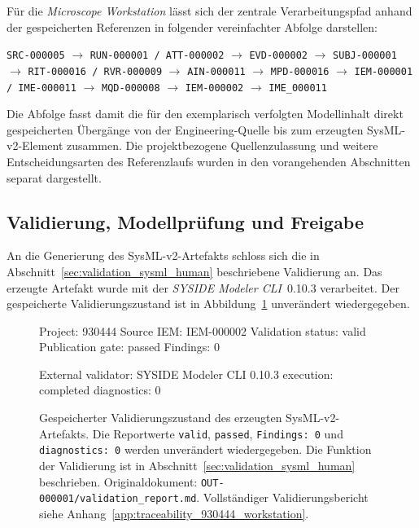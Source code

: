 Für die \emph{Microscope Workstation} lässt sich der zentrale
Verarbeitungspfad anhand der gespeicherten Referenzen in folgender
vereinfachter Abfolge darstellen:

\begin{center}
\small
\texttt{SRC-000005}
$\rightarrow$
\texttt{RUN-000001 / ATT-000002}
$\rightarrow$
\texttt{EVD-000002}
$\rightarrow$
\texttt{SUBJ-000001}
$\rightarrow$
\texttt{RIT-000016 / RVR-000009}
$\rightarrow$
\texttt{AIN-000011}
$\rightarrow$
\texttt{MPD-000016}
$\rightarrow$
\texttt{IEM-000001 / IME-000011}
$\rightarrow$
\texttt{MQD-000008}
$\rightarrow$
\texttt{IEM-000002}
$\rightarrow$
\texttt{IME\_000011}
\end{center}

Die Abfolge fasst damit die für den exemplarisch verfolgten Modellinhalt
direkt gespeicherten Übergänge von der Engineering-Quelle bis zum erzeugten
SysML-v2-Element zusammen. Die projektbezogene Quellenzulassung und weitere
Entscheidungsarten des Referenzlaufs wurden in den vorangehenden Abschnitten
separat dargestellt.

\subsection{Validierung, Modellprüfung und Freigabe}
\label{sec:results_traceability_release}

An die Generierung des SysML-v2-Artefakts schloss sich die in
Abschnitt~\ref{sec:validation_sysml_human} beschriebene Validierung an.
Das erzeugte Artefakt wurde mit der
\emph{SYSIDE Modeler CLI}~0.10.3 verarbeitet. Der gespeicherte
Validierungszustand ist in
Abbildung~\ref{fig:result_930444_validation} unverändert wiedergegeben.

\begin{figure}[htbp]
    \centering
    \begin{minipage}{0.94\textwidth}
        \begin{evidencebox}
Project:           930444
Source IEM:        IEM-000002
Validation status: valid
Publication gate:  passed
Findings:          0

External validator:
  SYSIDE Modeler CLI 0.10.3
  execution:   completed
  diagnostics: 0
        \end{evidencebox}
    \end{minipage}
    \caption[Validierungszustand des SysML-v2-Artefakts]{
    Gespeicherter Validierungszustand des erzeugten
    SysML-v2-Artefakts. Die Reportwerte \texttt{valid},
    \texttt{passed}, \texttt{Findings: 0} und
    \texttt{diagnostics: 0} werden unverändert wiedergegeben.
    Die Funktion der Validierung ist in
    Abschnitt~\ref{sec:validation_sysml_human} beschrieben.
    Originaldokument:
    \texttt{OUT-000001/validation\_report.md}.
    Vollständiger Validierungsbericht siehe
    Anhang~\ref{app:traceability_930444_workstation}.}
    \label{fig:result_930444_validation}
\end{figure}

